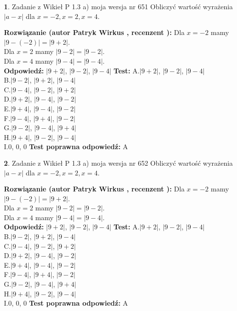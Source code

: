 \documentclass[12pt, a4paper]{article}
\theoremstyle{definition} %
\newtheorem{zad}{}
\newcommand{\zadStart}[1]{\begin{zad}#1\newline}
\newcommand{\zadStop}{\end{zad}}
\newcommand{\rozwStart}[2]{\noindent \textbf{Rozwiązanie (autor #1 , recenzent #2): }\newline}
\newcommand{\rozwStop}{\newline}
\newcommand{\odpStart}{\noindent \textbf{Odpowiedź:}\newline}
\newcommand{\odpStop}{\newline}
\newcommand{\testStart}{\noindent \textbf{Test:}\newline}
\newcommand{\testStop}{\newline}
\newcommand{\kluczStart}{\noindent \textbf{Test poprawna odpowiedź:}\newline}
\newcommand{\kluczStop}{\newline}
\begin{document}
\zadStart{Zadanie z Wikieł P 1.3 a) moja wersja nr 651}
Obliczyć wartość wyrażenia $|a - x|$ dla $x=-2,x=2,x=4$.
\zadStop
\rozwStart{Patryk Wirkus}{}
Dla $x = -2$ mamy $|9 - (-2)| = |9 + 2|$.\\
Dla $x = 2$ mamy $|9 - 2| = |9 - 2|$.\\
Dla $x = 4$ mamy $|9 - 4| = |9 - 4|$.\\
\rozwStop
\odpStart
$|9 + 2|$, $|9 - 2|$, $|9 - 4|$
\odpStop
\testStart
A.$|9 + 2|$, $|9 - 2|$, $|9 - 4|$\\
B.$|9 - 2|$, $|9 + 2|$, $|9 - 4|$\\
C.$|9 - 4|$, $|9 - 2|$, $|9 + 2|$\\
D.$|9 + 2|$, $|9 - 4|$, $|9 - 2|$\\
E.$|9 + 4|$, $|9 - 4|$, $|9 - 2|$\\
F.$|9 - 4|$, $|9 + 4|$, $|9 - 2|$\\
G.$|9 - 2|$, $|9 - 4|$, $|9 + 4|$\\
H.$|9 + 4|$, $|9 - 2|$, $|9 - 4|$\\
I.$0$, $0$, $0$
\testStop
\kluczStart
A
\kluczStop



\zadStart{Zadanie z Wikieł P 1.3 a) moja wersja nr 652}
Obliczyć wartość wyrażenia $|a - x|$ dla $x=-2,x=2,x=4$.
\zadStop
\rozwStart{Patryk Wirkus}{}
Dla $x = -2$ mamy $|9 - (-2)| = |9 + 2|$.\\
Dla $x = 2$ mamy $|9 - 2| = |9 - 2|$.\\
Dla $x = 4$ mamy $|9 - 4| = |9 - 4|$.\\
\rozwStop
\odpStart
$|9 + 2|$, $|9 - 2|$, $|9 - 4|$
\odpStop
\testStart
A.$|9 + 2|$, $|9 - 2|$, $|9 - 4|$\\
B.$|9 - 2|$, $|9 + 2|$, $|9 - 4|$\\
C.$|9 - 4|$, $|9 - 2|$, $|9 + 2|$\\
D.$|9 + 2|$, $|9 - 4|$, $|9 - 2|$\\
E.$|9 + 4|$, $|9 - 4|$, $|9 - 2|$\\
F.$|9 - 4|$, $|9 + 4|$, $|9 - 2|$\\
G.$|9 - 2|$, $|9 - 4|$, $|9 + 4|$\\
H.$|9 + 4|$, $|9 - 2|$, $|9 - 4|$\\
I.$0$, $0$, $0$
\testStop
\kluczStart
A
\kluczStop
\end{document}
